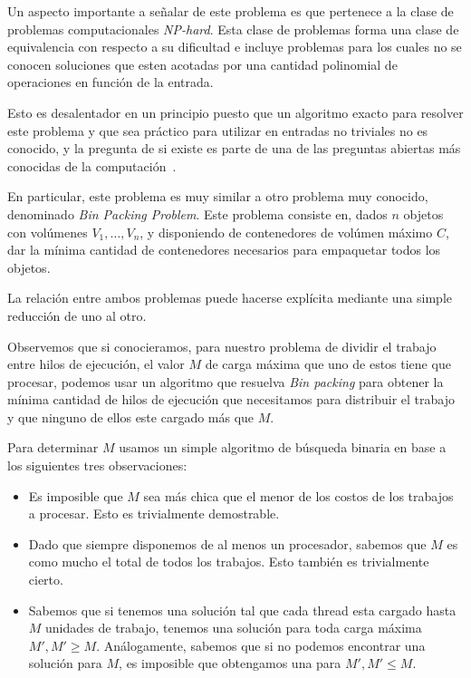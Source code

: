 Un aspecto importante a se\~nalar de este problema es que pertenece a la clase
de problemas computacionales \textit{NP-hard}. Esta clase de problemas forma una
clase de equivalencia con respecto a su dificultad e incluye problemas para los 
cuales no se conocen soluciones que esten acotadas por una cantidad polinomial 
de operaciones en funci\'on de la entrada.

Esto es desalentador en un principio puesto que un algoritmo exacto para resolver
este problema y que sea pr\'actico para utilizar en entradas no triviales no es
conocido, y la pregunta de si existe es parte de una de las preguntas abiertas
m\'as conocidas de la computaci\'on~\cite{Cormen}.

En particular, este problema es muy similar a otro problema muy conocido, 
denominado \textit{Bin Packing Problem}. Este problema consiste en, dados $n$ 
objetos con vol\'umenes $V_1, \dots, V_n$, y disponiendo de contenedores de
vol\'umen m\'aximo $C$, dar la m\'inima cantidad de contenedores necesarios para
empaquetar todos los objetos.

La relaci\'on entre ambos problemas puede hacerse expl\'icita mediante una simple
reducci\'on de uno al otro.

Observemos que si conocieramos, para nuestro problema de dividir el trabajo entre
hilos de ejecuci\'on, el valor $M$ de carga m\'axima que uno de estos tiene que
procesar, podemos usar un algoritmo que resuelva \textit{Bin packing} para 
obtener la m\'inima cantidad de hilos de ejecuci\'on que necesitamos para distribuir
el trabajo y que ninguno de ellos este cargado m\'as que $M$. 

Para determinar $M$ usamos un simple algoritmo de b\'usqueda binaria en base a los
siguientes tres observaciones:

\begin{itemize}
    \item Es imposible que $M$ sea m\'as chica que el menor de los costos de los
    trabajos a procesar. Esto es trivialmente demostrable.
    \item Dado que siempre disponemos de al menos un procesador, sabemos que $M$
    es como mucho el total de todos los trabajos. Esto tambi\'en es trivialmente
    cierto.
    \item Sabemos que si tenemos una soluci\'on tal que cada thread esta cargado
    hasta $M$ unidades de trabajo, tenemos una soluci\'on para toda carga m\'axima
    $M', M' \geq M$. An\'alogamente, sabemos que si no podemos encontrar una 
    soluci\'on para $M$, es imposible que obtengamos una para $M', M' \leq M$.
\end{itemize}

